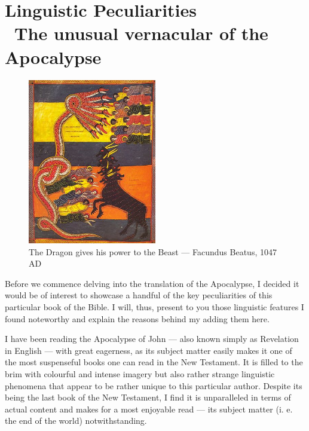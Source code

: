 \chapter*{Linguistic Peculiarities \\ \large The unusual vernacular of the Apocalypse}
  
\begin{figure}
	\centering
	\includegraphics[width=0.5\textwidth]{images/linguisticpeculiarities/dragonsevenheads.jpg}
	\small\caption{The Dragon gives his power to the Beast — Facundus Beatus, 1047 AD}
\end{figure} 

Before we commence delving into the translation of the Apocalypse, I decided it would be of interest to showcase a handful of the key peculiarities of this particular book of the Bible. I will, thus, present to you those linguistic features I found noteworthy and explain the reasons behind my adding them here. 

I have been reading the Apocalypse of John — also known simply as Revelation in English — with great eagerness, as its subject matter easily makes it one of the most suspenseful books one can read in the New Testament. It is filled to the brim with colourful and intense imagery but also rather strange linguistic phenomena that appear to be rather unique to this particular author. Despite its being the last book of the New Testament, I find it is unparalleled in terms of actual content and makes for a most enjoyable read — its subject matter (i. e. the end of the world) notwithstanding.

